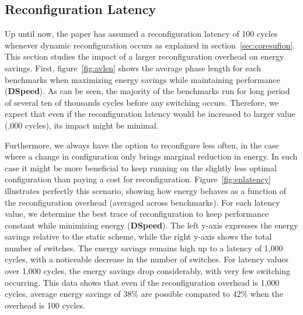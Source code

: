\subsection{Reconfiguration Latency} \label{sec:reconfoverhead}

Up until now, the paper has assumed a reconfiguration latency of 100 cycles whenever dynamic reconfiguration occurs as explained in section~\ref{sec:coresufion}.
This section studies the impact of a larger reconfiguration overhead on energy savings.
First, figure~\ref{fig:avlen} shows the average phase length for each benchmarks when maximizing energy savings while maintaining performance (\textbf{DSpeed}).
As can be seen, the majority of the benchmarks run for long period of several ten of thousands cycles before any switching occurs.
Therefore, we expect that even if the reconfiguration latency would be increased to larger value (,000 cycles), its impact might be minimal.

Furthermore, we always have the option to reconfigure less often, in the case where a change in configuration only brings marginal reduction in energy.
In such case it might be more beneficial to keep running on the slightly less optimal configuration than paying a cost for reconfiguration.
Figure~\ref{fig:enlatency} illustrates perfectly this scenario, showing how energy behaves as a function of the reconfiguration overhead (averaged across benchmarks).
For each latency value, we determine the best trace of reconfiguration to keep performance constant while minimizing energy (\textbf{DSpeed}).
The left y-axis expresses the energy savings relative to the static scheme, while the right y-axis shows the total number of switches.
The energy savings remains high up to a latency of 1,000 cycles, with a noticeable decrease in the number of switches.
For latency values over 1,000 cycles, the energy savings drop considerably, with very few switching occurring.
This data shows that even if the reconfiguration overhead is 1,000 cycles, average energy savings of 38\% are possible compared to 42\% when the overhead is 100 cycles.

